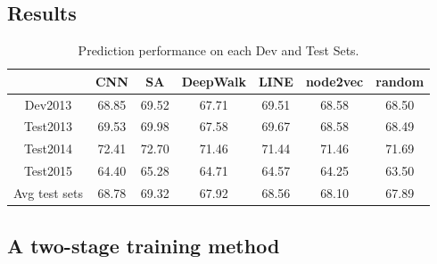 \subsection{Results}

\begin{table}[htbp]
\begin{center}
\begin{tabular}{|c|c| c | c c c c|}
\hline
 & CNN & SA
\footnotemark
& DeepWalk & LINE & node2vec & random\\
\hline
Dev2013  & 68.85 &69.52 & 67.71 & 69.51 & 68.58 & 68.50 \\
\hline
Test2013  & 69.53 & 69.98& 67.58 & 69.67 & 68.58 & 68.49 \\
Test2014  & 72.41 & 72.70 & 71.46 & 71.44 & 71.46 & 71.69 \\
Test2015  & 64.40 &65.28 & 64.71 & 64.57 & 64.25 & 63.50 \\
\hline
Avg test sets & 68.78 &69.32& 67.92 & 68.56  & 68.10 & 67.89 \\
\hline
\end{tabular}
\end{center}
\caption{Prediction performance on each Dev and Test Sets. }
\label{Tb:}
\end{table}%


\subsection{A two-stage training method}